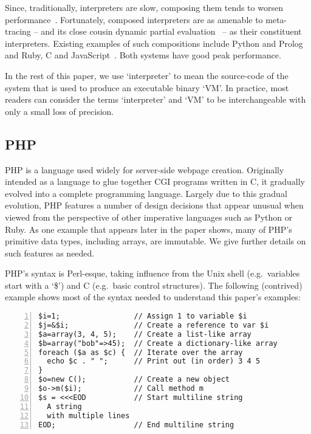 \documentclass[a4paper,UKenglish]{lipics-v2016}
\begin{document}
Since, traditionally, interpreters are slow, composing them tends to worsen
performance~\cite{barrett15approaches}. Fortunately, composed interpreters are as amenable to
meta-tracing -- and its close cousin dynamic partial evaluation~\cite{wuerthinger13onevm} --
as their constituent interpreters. Existing
examples of such compositions include Python and Prolog~\cite{barrett15approaches}
and Ruby, C and JavaScript~\cite{grimmer15interop}. Both systems have good
peak performance.

In the rest of this paper, we use `interpreter' to mean the source-code of the
system that is used to produce an executable binary `VM'. In practice, most readers
can consider the terms `interpreter' and `VM' to be interchangeable with only
a small loss of precision.


\subsection{PHP}

PHP is a language used widely for server-side webpage creation. Originally intended as a language
to glue together CGI programs written in C, it
gradually evolved into a complete programming language. Largely due to this
gradual evolution, PHP features a number of design decisions that appear unusual
when viewed from the perspective of other imperative languages such as Python or
Ruby. As one example that appears later in the paper shows, many of PHP's primitive
data types, including arrays, are immutable.
We give further details on such features as needed.

PHP's syntax is Perl-esque, taking influence from the Unix shell
(e.g.~variables start with a `\$') and C (e.g.~basic control structures).
The following (contrived) example shows most of the syntax needed to understand
this paper's examples:
\begin{lstlisting}[label=lst:phpoverview, numbers=left]
$i=1;                 // Assign 1 to variable $i
$j=&$i;               // Create a reference to var $i
$a=array(3, 4, 5);    // Create a list-like array
$b=array("bob"=>45);  // Create a dictionary-like array
foreach ($a as $c) {  // Iterate over the array
  echo $c . " ";      // Print out (in order) 3 4 5
}
$o=new C();           // Create a new object
$o->m($i);            // Call method m
$s = <<<EOD           // Start multiline string
  A string
  with multiple lines
EOD;                  // End multiline string
\end{lstlisting}
\end{document}
